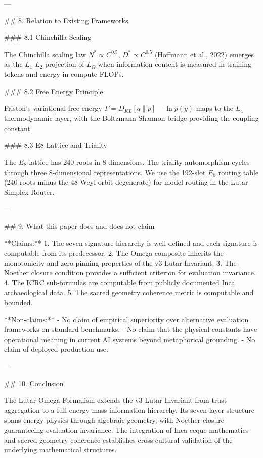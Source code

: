 ---

## 8. Relation to Existing Frameworks

### 8.1 Chinchilla Scaling

The Chinchilla scaling law \( N^* \propto C^{0.5} \), \( D^* \propto C^{0.5} \) (Hoffmann et al., 2022) emerges as the \( L_1 \)-\( L_2 \) projection of \( L_\Omega \) when information content is measured in training tokens and energy in compute FLOPs.

### 8.2 Free Energy Principle

Friston's variational free energy \( F = D_{KL}[q \| p] - \ln p(\tilde{y}) \) maps to the \( L_4 \) thermodynamic layer, with the Boltzmann-Shannon bridge providing the coupling constant.

### 8.3 E8 Lattice and Triality

The \( E_8 \) lattice has 240 roots in 8 dimensions. The triality automorphism cycles through three 8-dimensional representations. We use the 192-slot \( E_8 \) routing table (240 roots minus the 48 Weyl-orbit degenerate) for model routing in the Lutar Simplex Router.

---

## 9. What this paper does and does not claim

**Claims:**
1. The seven-signature hierarchy is well-defined and each signature is computable from its predecessor.
2. The Omega composite inherits the monotonicity and zero-pinning properties of the v3 Lutar Invariant.
3. The Noether closure condition provides a sufficient criterion for evaluation invariance.
4. The ICRC sub-formulas are computable from publicly documented Inca archaeological data.
5. The sacred geometry coherence metric is computable and bounded.

**Non-claims:**
- No claim of empirical superiority over alternative evaluation frameworks on standard benchmarks.
- No claim that the physical constants have operational meaning in current AI systems beyond metaphorical grounding.
- No claim of deployed production use.

---

## 10. Conclusion

The Lutar Omega Formalism extends the v3 Lutar Invariant from trust aggregation to a full energy-mass-information hierarchy. Its seven-layer structure spans energy physics through algebraic geometry, with Noether closure guaranteeing evaluation invariance. The integration of Inca ceque mathematics and sacred geometry coherence establishes cross-cultural validation of the underlying mathematical structures.


